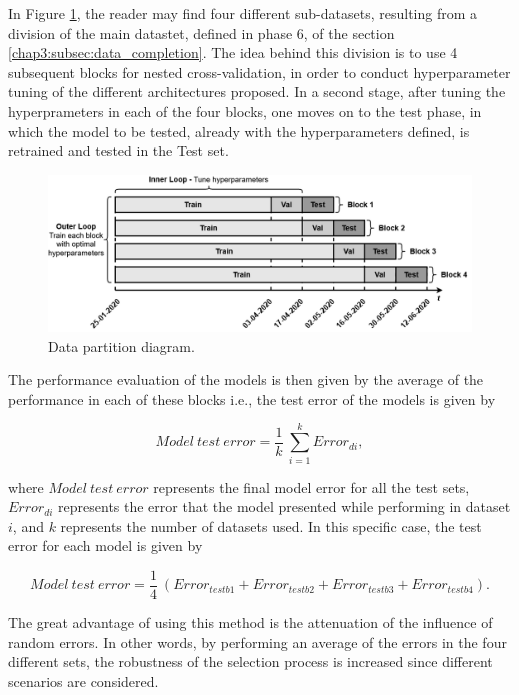 In Figure \ref{partition}, the reader may find four different sub-datasets, resulting from a division of the main datastet, defined in phase 6, of the section \ref{chap3:subsec:data_completion}. The idea behind this division is to use 4 subsequent blocks for nested cross-validation, in order to conduct hyperparameter tuning of the different architectures proposed. In a second stage, after tuning the hyperprameters in each of the four blocks, one moves on to the test phase, in which the model to be tested, already with the hyperparameters defined, is retrained and tested in the Test set.

\begin{figure}[h!]
    \centering
    \begin{center}
    \includegraphics[width=1\textwidth]{Images/hyptun_.png}
    \caption{Data partition diagram.}
    \label{partition}
    \end{center}
\end{figure}

The performance evaluation of the models is then given by the average of the performance in each of these blocks i.e., the test error of the models is given by

\begin{equation}
     Model\ test\ error =\frac {1}{k}\ \sum_{i=1}^k Error_{di},
\label{err_av}
\end{equation}

where $Model\ test\ error$ represents the final model error for all the test sets, $Error_{di}$ represents the error that the model presented while performing in dataset $i$, and $k$ represents the number of datasets used.
In this specific case, the test error for each model is given by

\begin{equation}
     Model\ test\ error =\frac {1}{4}\ (Error_{testb1} + Error_{testb2} + Error_{testb3} + Error_{testb4}).
\label{err_av}
\end{equation}

The great advantage of using this method is the attenuation of the influence of random errors. In other words, by performing an average of the errors in the four different sets, the robustness of the selection process is increased since different scenarios are considered.


